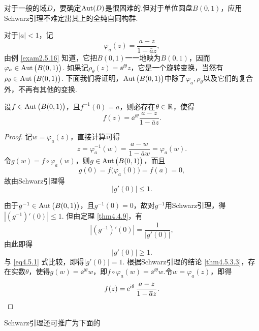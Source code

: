 对于一般的域$D$，要确定$\operatorname{Aut}(D)$是很困难的.但对于单位圆盘$B(0,1)$，应用Schwarz引理不难定出其上的全纯自同构群.

对于$|a|<1$，记
\[
  \varphi_a(z) = \frac{a-z}{1-\bar az},
\]
由例 \ref{exam2.5.16} 知道，它把$B(0,1)$一一地映为$B(0,1)$，因而$\varphi_a\in\operatorname{Aut}\big(B(0,1)\big)$. 如果记$\rho_\theta(z)=\ee^{\ii\theta}z$，它是一个旋转变换，当然有$\rho_\theta\in\operatorname{Aut}\big(B(0,1)\big)$. 下面我们将证明，$\operatorname{Aut}\big(B(0,1)\big)$中除了$\varphi_a,\rho_\theta$以及它们的复合外，不再有其他的变换.
\begin{theorem}\label{thm4.5.5}
  设$f\in \operatorname{Aut}\big(B(0,1)\big)$，且$f^{-1}(0)=a$，则必存在$\theta\in\mathbb R$，使得
  \[
    f(z) = \ee^{\ii\theta}\frac{a-z}{1-\bar az}.
  \]
\end{theorem}
\begin{proof}
  记$w=\varphi_a(z)$，直接计算可得
  \[
    z = \varphi_a^{-1}(w) = \frac{a-w}{1-\bar aw} = \varphi_a(w).
  \]
  令$g(w)=f\circ \varphi_a(w)$，则$g\in\operatorname{Aut}\big(B(0,1)\big)$，而且
  \[
    g(0) = f\big(\varphi_a(0)\big) = f(a) = 0,
  \]
  故由Schwarz引理得
  \begin{equation}\label{eq4.5.1}
    |g'(0)|\le1.
  \end{equation}

  由于$g^{-1}\in\operatorname{Aut}\big(B(0,1)\big)$，且$g^{-1}(0)=0$，故对$g^{-1}$用Schwarz引理，得$|(g^{-1})'(0)|\le1$. 但由定理 \ref{thm4.4.9}，有
  \[
    |(g^{-1})'(0)| = \frac1{|g'(0)|},
  \]
  由此即得
  \[
    |g'(0)|\ge1.
  \]
  与 \eqref{eq4.5.1} 式比较，即得$|g'(0)|=1$. 根据Schwarz引理的结论 \ref{thm4.5.3.3}，存在实数$\theta$，使得$g(w)=\ee^{\ii\theta}w$，即$f\circ\varphi_a(w)=\ee^{\ii\theta}w$.令$w=\varphi_a(z)$，即得
  \begin{equation*}
    f(z) = \operatorname{\!\!\;\mathrm e}^{\mathrm i\theta}\frac{a-z}{1-{}\mkern1mu\overline{\mkern-1mua}z}. \qedhere
  \end{equation*}
\end{proof}

Schwarz引理还可推广为下面的

